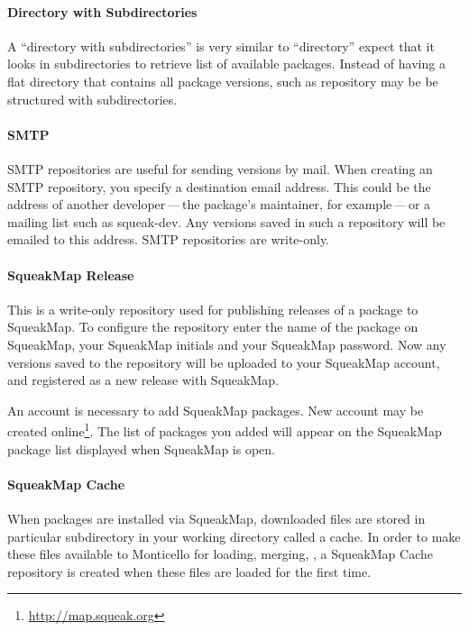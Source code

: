 \documentclass[a4paper,10pt,twoside]{book}
\begin{document}
\paragraph{Directory with Subdirectories}  A ``directory with subdirectories'' is very similar to ``directory'' expect that it looks in subdirectories to retrieve list of available packages. Instead of having a flat directory that contains all package versions, such as repository may be be structured with  subdirectories.

\paragraph{SMTP} SMTP repositories are useful for sending versions by mail. When creating an SMTP repository, you specify a destination email address. This could be the address of another developer\,---\,the package's maintainer, for example\,---\,or a mailing list such as squeak-dev. Any versions saved in such a repository will be emailed to this address.  SMTP repositories are write-only.

\paragraph{SqueakMap Release} This is a write-only repository used for publishing releases of a package to SqueakMap. To configure the repository enter the name of the package on SqueakMap, your SqueakMap initials and your SqueakMap password. Now any versions saved to the repository will be uploaded to your SqueakMap account, and registered as a new release with SqueakMap.  

An account is necessary to add SqueakMap packages. New account may be created online\footnote{\url{http://map.squeak.org}}. The list of packages you added will appear on the SqueakMap package list displayed when SqueakMap is open.


\paragraph{SqueakMap Cache} When packages are installed via SqueakMap, downloaded files are stored in particular subdirectory in your working directory called a cache. In order to make these files available to Monticello for loading, merging, \etc, a SqueakMap Cache repository is created when these files are loaded for the first time.
\end{document}
